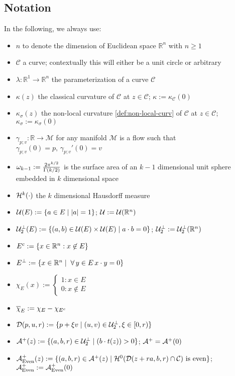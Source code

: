 \documentclass{article}
\newcommand{\haus}[2]{\mathcal{H}^{#1}\parens{#2}}
\newcommand{\R}[1]{\mathbb{R}^{#1}}
\newcommand{\optparens}[1]{\ifthenelse{\equal{#1}{}}{}{\parens{#1}}}
\newcommand{\U}[1]{\mathcal{U}\optparens{#1}}
\newcommand{\UTP}[1]{\mathcal{U}_2^\perp\optparens{#1}}
\newcommand{\chit}[2]{\overline{\chi}_{#1}\optparens{#2}}
\newcommand{\D}[1]{\mathcal{D}\optparens{#1}}
\newcommand{\A}{\mathcal{A}^{+}}
\newcommand{\Ae}{\A_{\textup{Even}}}
\newcommand{\C}{\mathcal{C}}
\newcommand{\ks}{\kappa_\sigma}
\renewcommand{\dot}[2]{{#1}\cdot{#2}}
\newcommand{\pdot}[2]{\parens{\dot{#1}{#2}}}
\begin{document}
\subsection{Notation}
In the following, we always use:
\begin{itemize}
  \item $n$ to denote the dimension of Euclidean space $\R{n}$ with $n \ge 1$
  \item $\C$ a curve; contextually this will either be a unit circle or arbitrary
  \item $\lambda : \R{1} \to \R{n}$ the parameterization of a curve $\mathcal{C}$
  \item $\kappa(z)$ the classical curvature of $\mathcal{C}$ at $z \in \mathcal{C}$; $\kappa := \kappa_{\mathcal{C}}(0)$
  \item $\ks(z)$ the non-local curvature \eqref{def:non-local-curv} of $\mathcal{C}$ at $z \in \mathcal{C}$; $\ks := \ks(0)$
  \item $\gamma_{p;v} : \mathbb{R} \to \mathcal{M}$ for any manifold $\mathcal{M}$ is a flow such that $\gamma_{p;v}(0) = p, \, \gamma_{p;v}'(0) = v$
  \item $\omega_{k-1} := \frac{2\pi^{k/2}}{\Gamma(k/2)}$ is the surface area of an $k-1$ dimensional unit sphere embedded in $k$ dimensional space
  \item $\haus{k}{\cdot}$ the $k$ dimensional Hausdorff measure
  \item $\U{E} := \braces{ a \in E \mid \abs{a} = 1 }$; $\U{} := \U{\R{n}}$
  \item $\UTP{E} := \braces{ (a, b) \in \U{E} \times \U{E} \mid \dot{a}{b} = 0 }$; $\UTP{} := \UTP{\R{n}}$
  \item $E^c := \braces{ x \in \R{n} : x \not\in E }$
  \item $E^\perp := \braces{ x \in \R{n} \mid \forall y \in E \, \dot{x}{y} = 0 }$
  \item $\chi_E(x) := \begin{cases} 1 : x \in E \\ 0 : x \not\in E \end{cases}$
  \item $\chit{E}{} := \chi_E - \chi_{E^c}$
  \item $\D{p, u, r} := \braces{ p + \xi v \mid \parens{u, v} \in \UTP{}, \xi \in [0, r) }$
  \item $\A\parens{z} := \braces{\parens{a, b, r} \in \UTP{} \mid \pdot{b}{t(z)} > 0}$; $\A = \A\parens{0}$
  \item $\Ae \parens{z} := \braces{\parens{a, b, r} \in \A{}\parens{z} \mid \haus{0}{\D{z + ra, b, r} \cap \C} \text{ is even}}$; $\Ae := \Ae\parens{0}$

\end{itemize}
\end{document}
